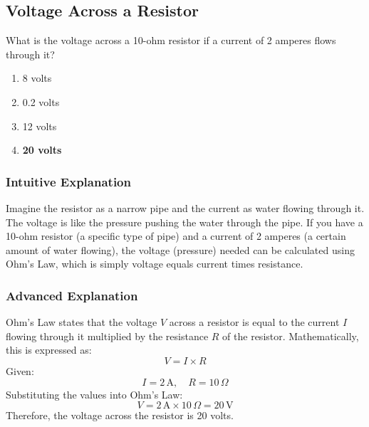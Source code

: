 \subsection{Voltage Across a Resistor}
\label{T5D12}

\begin{tcolorbox}[colback=gray!10!white,colframe=black!75!black,title=T5D12]
What is the voltage across a 10-ohm resistor if a current of 2 amperes flows through it?
\begin{enumerate}[noitemsep]
    \item 8 volts
    \item 0.2 volts
    \item 12 volts
    \item \textbf{20 volts}
\end{enumerate}
\end{tcolorbox}

\subsubsection*{Intuitive Explanation}
Imagine the resistor as a narrow pipe and the current as water flowing through it. The voltage is like the pressure pushing the water through the pipe. If you have a 10-ohm resistor (a specific type of pipe) and a current of 2 amperes (a certain amount of water flowing), the voltage (pressure) needed can be calculated using Ohm's Law, which is simply voltage equals current times resistance.

\subsubsection*{Advanced Explanation}
Ohm's Law states that the voltage \( V \) across a resistor is equal to the current \( I \) flowing through it multiplied by the resistance \( R \) of the resistor. Mathematically, this is expressed as:
\[
V = I \times R
\]
Given:
\[
I = 2 \, \text{A}, \quad R = 10 \, \Omega
\]
Substituting the values into Ohm's Law:
\[
V = 2 \, \text{A} \times 10 \, \Omega = 20 \, \text{V}
\]
Therefore, the voltage across the resistor is 20 volts.